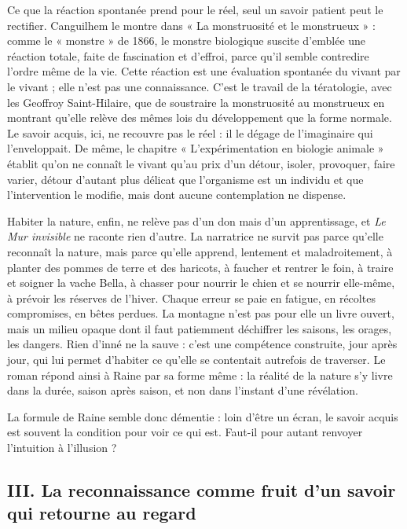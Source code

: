 \documentclass[11pt,a4paper]{article}
\begin{document}
Ce que la réaction spontanée prend pour le réel, seul un savoir patient peut le rectifier. Canguilhem le montre dans « La monstruosité et le monstrueux » : comme le « monstre » de 1866, le monstre biologique suscite d'emblée une réaction totale, faite de fascination et d'effroi, parce qu'il semble contredire l'ordre même de la vie. Cette réaction est une évaluation spontanée du vivant par le vivant ; elle n'est pas une connaissance. C'est le travail de la tératologie, avec les Geoffroy Saint-Hilaire, que de soustraire la monstruosité au monstrueux en montrant qu'elle relève des mêmes lois du développement que la forme normale. Le savoir acquis, ici, ne recouvre pas le réel : il le dégage de l'imaginaire qui l'enveloppait. De même, le chapitre « L'expérimentation en biologie animale » établit qu'on ne connaît le vivant qu'au prix d'un détour, isoler, provoquer, faire varier, détour d'autant plus délicat que l'organisme est un individu et que l'intervention le modifie, mais dont aucune contemplation ne dispense.

Habiter la nature, enfin, ne relève pas d'un don mais d'un apprentissage, et \emph{Le Mur invisible} ne raconte rien d'autre. La narratrice ne survit pas parce qu'elle reconnaît la nature, mais parce qu'elle apprend, lentement et maladroitement, à planter des pommes de terre et des haricots, à faucher et rentrer le foin, à traire et soigner la vache Bella, à chasser pour nourrir le chien et se nourrir elle-même, à prévoir les réserves de l'hiver. Chaque erreur se paie en fatigue, en récoltes compromises, en bêtes perdues. La montagne n'est pas pour elle un livre ouvert, mais un milieu opaque dont il faut patiemment déchiffrer les saisons, les orages, les dangers. Rien d'inné ne la sauve : c'est une compétence construite, jour après jour, qui lui permet d'habiter ce qu'elle se contentait autrefois de traverser. Le roman répond ainsi à Raine par sa forme même : la réalité de la nature s'y livre dans la durée, saison après saison, et non dans l'instant d'une révélation.

La formule de Raine semble donc démentie : loin d'être un écran, le savoir acquis est souvent la condition pour voir ce qui est. Faut-il pour autant renvoyer l'intuition à l'illusion ?

\hypertarget{iii.-la-reconnaissance-comme-fruit-dun-savoir-qui-retourne-au-regard}{%
\subsection{III. La reconnaissance comme fruit d'un savoir qui retourne au regard}\label{iii.-la-reconnaissance-comme-fruit-dun-savoir-qui-retourne-au-regard}}
\end{document}
